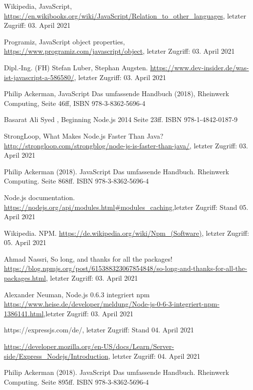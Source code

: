 \documentclass[11pt,a4paper]{article}
\begin{document}
\begin{itemize}
 Wikipedia, JavaScript, \url{https://en.wikibooks.org/wiki/JavaScript/Relation_to_other_languages}, letzter Zugriff: 03. April 2021

 Programiz, JavaScript object properties, \url{https://www.programiz.com/javascript/object}, letzter Zugriff: 03. April 2021

 Dipl.-Ing. (FH) Stefan Luber, Stephan Augsten. \url{https://www.dev-insider.de/was-ist-javascript-a-586580/}, letzter Zugriff: 03. April 2021

 Philip Ackerman, JavaScript Das umfassende Handbuch (2018), Rheinwerk Computing, Seite 46ff, ISBN 978-3-8362-5696-4

%
%
%
%



 Basarat Ali Syed , Beginning Node.js 2014 Seite 23ff. ISBN 978-1-4842-0187-9

 StrongLoop, What Makes Node.js Faster Than Java? \url{http://strongloop.com/strongblog/node-js-is-faster-than-java/}, letzter Zugriff: 03. April 2021

 Philip Ackerman (2018). JavaScript Das umfassende Handbuch. Rheinwerk Computing. Seite 868ff. ISBN 978-3-8362-5696-4

 Node.js documentation. \url{https://nodejs.org/api/modules.html#modules_caching},letzter Zugriff: Stand 05. April 2021

 Wikipedia. NPM. \url{https://de.wikipedia.org/wiki/Npm_(Software)}, letzter Zugriff: 05. April 2021

 Ahmad Nassri, So long, and thanks for all the packages! \url{https://blog.npmjs.org/post/615388323067854848/so-long-and-thanks-for-all-the-packages.html}, letzter Zugriff: 03. April 2021

 Alexander Neuman, Node.js 0.6.3 integriert npm
\url{https://www.heise.de/developer/meldung/Node-js-0-6-3-integriert-npm-1386141.html},letzter Zugriff: 03. April 2021

 https://expressjs.com/de/, letzter Zugriff: Stand 04. April 2021

 \url{https://developer.mozilla.org/en-US/docs/Learn/Server-side/Express_Nodejs/Introduction}, letzter Zugriff: 04. April 2021

 Philip Ackerman (2018). JavaScript Das umfassende Handbuch. Rheinwerk Computing. Seite 895ff. ISBN 978-3-8362-5696-4


\end{itemize}
\end{document}

